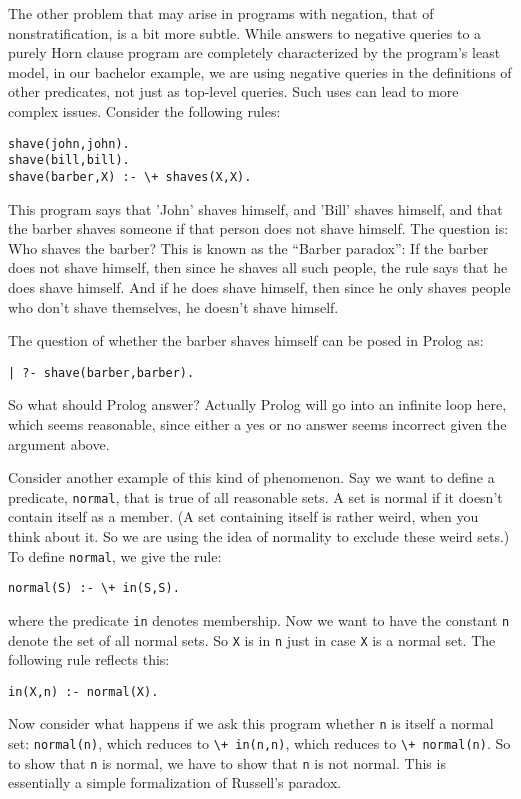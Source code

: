 The other problem that may arise in programs with negation, that of
nonstratification, is a bit more subtle.  While answers to negative
queries to a purely Horn clause program are completely characterized
by the program's least model, in our bachelor example, we are using
negative queries in the definitions of other predicates, not just as
top-level queries.  Such uses can lead to more complex issues.
Consider the following rules:
\begin{verbatim}
shave(john,john).
shave(bill,bill).
shave(barber,X) :- \+ shaves(X,X).
\end{verbatim}
This program says that 'John' shaves himself, and 'Bill' shaves
himself, and that the barber shaves someone if that person does not
shave himself.  The question is: Who shaves the barber?  This is known
as the ``Barber paradox'': If the barber does not shave himself, then
since he shaves all such people, the rule says that he does shave
himself.  And if he does shave himself, then since he only shaves
people who don't shave themselves, he doesn't shave himself.

The question of whether the barber shaves himself can be posed in
Prolog as:
\begin{verbatim}
| ?- shave(barber,barber).
\end{verbatim}
So what should Prolog answer?  Actually Prolog will go into an
infinite loop here, which seems reasonable, since either a yes or no
answer seems incorrect given the argument above.

Consider another example of this kind of phenomenon.  Say we want to
define a predicate, \verb|normal|, that is true of all reasonable
sets.  A set is normal if it doesn't contain itself as a member.  (A
set containing itself is rather weird, when you think about it.  So we
are using the idea of normality to exclude these weird sets.)  To
define \verb|normal|, we give the rule:
\begin{verbatim}
normal(S) :- \+ in(S,S).
\end{verbatim}
where the predicate \verb|in| denotes membership.  Now we want to have
the constant \verb|n| denote the set of all normal sets.  So \verb|X|
is in \verb|n| just in case \verb|X| is a normal set.  The following
rule reflects this:
\begin{verbatim}
in(X,n) :- normal(X).
\end{verbatim}
Now consider what happens if we ask this program whether \verb|n| is
itself a normal set: \verb|normal(n)|, which reduces to 
\verb|\+ in(n,n)|, which reduces to \verb|\+ normal(n)|.  So to show that
\verb|n| is normal, we have to show that \verb|n| is not normal.  This
is essentially a simple formalization of Russell's paradox.


